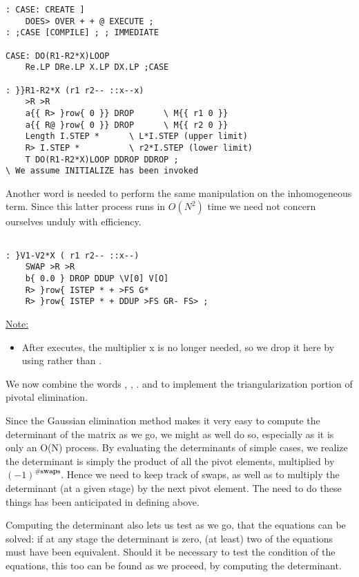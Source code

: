 \begin{verbatim}
: CASE: CREATE ]
    DOES> OVER + + @ EXECUTE ;
: ;CASE [COMPILE] ; ; IMMEDIATE

CASE: DO(R1-R2*X)LOOP
    Re.LP DRe.LP X.LP DX.LP ;CASE

: }}R1-R2*X (r1 r2-- ::x--x)
    >R >R
    a{{ R> }row{ 0 }} DROP      \ M{{ r1 0 }} 
    a{{ R@ }row{ 0 }} DROP      \ M{{ r2 0 }} 
    Length I.STEP *      \ L*I.STEP (upper limit)
    R> I.STEP *          \ r2*I.STEP (lower limit)
    T DO(R1-R2*X)LOOP DDROP DDROP ;
\ We assume INITIALIZE has been invoked
\end{verbatim} 
Another word is needed to perform the same manipulation on
the inhomogeneous term. Since this latter process runs in $O(N^2)$
time we need not concern ourselves unduly with efficiency.
\begin{verbatim}

: }V1-V2*X ( r1 r2-- ::x--)
    SWAP >R >R
    b{ 0.0 } DROP DDUP \V[0] V[O]
    R> }row{ ISTEP * + >FS G*
    R> }row{ ISTEP * + DDUP >FS GR- FS> ;
\end{verbatim} 

\underline{Note:}
\begin{itemize}
    \item  After  executes, the multiplier x is no longer needed,
        so we drop it here by using  rather than .
\end{itemize}

We now combine the words , , .
 and  to implement the triangularization portion of pivotal elimination.

Since the Gaussian elimination method makes it very easy to
compute the determinant of the matrix as we go, we might as well
do so, especially as it is only an O(N) process. By evaluating the
determinants of simple cases, we realize the determinant is simply the product of all the pivot elements, multiplied by
$(-1)^{\#\mathbf{swaps}}$. Hence we need to keep track of swaps, as well as to
multiply the determinant (at a given stage) by the next pivot
element. The need to do these things has been anticipated in
defining  above.

Computing the determinant also lets us test as we go, that the
equations can be solved: if at any stage the determinant is zero,
(at least) two of the equations must have been equivalent. Should
it be necessary to test the condition of the equations, this too
can be found as we proceed, by computing the determinant.

